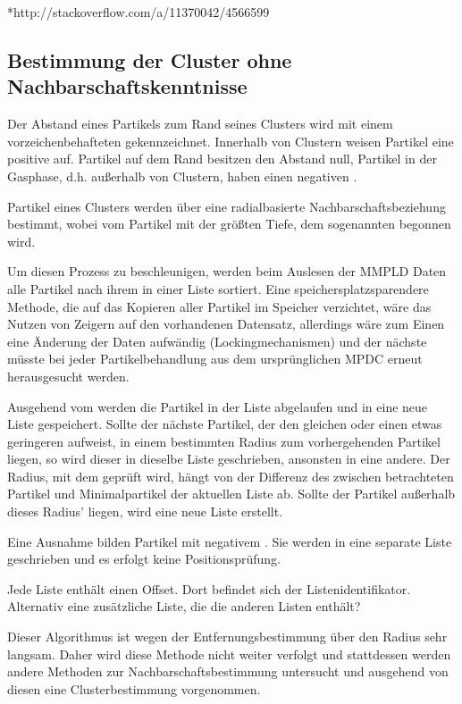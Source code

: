 *http://stackoverflow.com/a/11370042/4566599


\subsection{Bestimmung der Cluster ohne Nachbarschaftskenntnisse}
Der Abstand eines Partikels zum Rand seines Clusters wird mit einem vorzeichenbehafteten  gekennzeichnet. Innerhalb von Clustern weisen Partikel eine positive  auf. Partikel auf dem Rand besitzen den Abstand null, Partikel in der Gasphase, d.h. außerhalb von Clustern, haben einen negativen .

Partikel eines Clusters werden über eine radialbasierte Nachbarschaftsbeziehung bestimmt, wobei vom Partikel mit der größten Tiefe, dem sogenannten  begonnen wird.

Um diesen Prozess zu beschleunigen, werden beim Auslesen der MMPLD Daten alle Partikel nach ihrem  in einer Liste sortiert. Eine speichersplatzsparendere Methode, die auf das Kopieren aller Partikel im Speicher verzichtet, wäre das Nutzen von Zeigern auf den vorhandenen Datensatz, allerdings wäre zum Einen eine Änderung der Daten aufwändig (Lockingmechanismen) und der nächste  müsste bei jeder Partikelbehandlung aus dem ursprünglichen MPDC erneut herausgesucht werden.

Ausgehend vom  werden die Partikel in der Liste abgelaufen und in eine neue Liste gespeichert. Sollte der nächste Partikel, der den gleichen oder einen etwas geringeren  aufweist, in einem bestimmten Radius zum vorhergehenden Partikel liegen, so wird dieser in dieselbe Liste geschrieben, ansonsten in eine andere. Der Radius, mit dem geprüft wird, hängt von der Differenz des  zwischen betrachteten Partikel und Minimalpartikel der aktuellen Liste ab. Sollte der Partikel außerhalb dieses Radius' liegen, wird eine neue Liste erstellt.

Eine Ausnahme bilden Partikel mit negativem . Sie werden in eine separate Liste geschrieben und es erfolgt keine Positionsprüfung.

Jede Liste enthält einen Offset. Dort befindet sich der Listenidentifikator. Alternativ eine zusätzliche Liste, die die anderen Listen enthält?

Dieser Algorithmus ist wegen der Entfernungsbestimmung über den Radius sehr langsam. Daher wird diese Methode nicht weiter verfolgt und stattdessen werden andere Methoden zur Nachbarschaftsbestimmung untersucht und ausgehend von diesen eine Clusterbestimmung vorgenommen.

